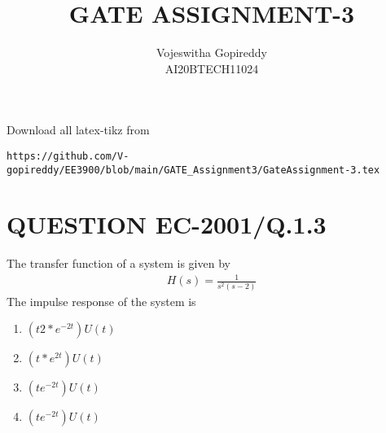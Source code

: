 \documentclass[journal,12pt,twocolumn]{IEEEtran}
\begin{document}
     \def\centbox#1{\makebox[0in]{#1}}
     \def\topbox#1{\raisebox{-\baselineskip}[0in][0in]{#1}}
     \def\midbox#1{\raisebox{-0.5\baselineskip}[0in][0in]{#1}}
\vspace{3cm}
\title{GATE ASSIGNMENT-3}
\author{Vojeswitha Gopireddy \\ AI20BTECH11024}
\maketitle
\newpage
\bigskip
\renewcommand{\thefigure}{\theenumi}
\renewcommand{\thetable}{\theenumi}
Download all latex-tikz from 
%
\begin{lstlisting}
https://github.com/V-gopireddy/EE3900/blob/main/GATE_Assignment3/GateAssignment-3.tex
\end{lstlisting}
\section{QUESTION EC-2001/Q.1.3}
The transfer function of a system is given by 
\begin{align}
  H(s) = \frac{1}{s^2(s-2)}  
\end{align}
The impulse response of the system is
\begin{enumerate}
    \item  $(t2 * e^{-2t})U(t)$
    \item $(t * e^{2t})U(t)$
    \item $(te^{-2t})U(t)$
    \item $(te^{-2t})U(t)$
\end{enumerate}
%
\end{document}
